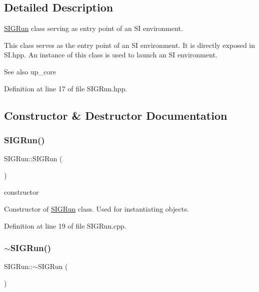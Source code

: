 \subsection{Detailed Description}
\mbox{\hyperlink{class_s_i_g_run}{S\+I\+G\+Run}} class serving as entry point of an SI environment. 

This class serves as the entry point of an SI environment. It is directly exposed in S\+I.\+hpp. An instance of this class is used to launch an SI environment. \begin{DoxySeeAlso}{See also}
up\+\_\+core 
\end{DoxySeeAlso}


Definition at line 17 of file S\+I\+G\+Run.\+hpp.



\subsection{Constructor \& Destructor Documentation}
\mbox{\label{class_s_i_g_run_a42faa5a4dd64664d6bdce6c94f5adc1d}} 
\subsubsection{\texorpdfstring{SIGRun()}{SIGRun()}}
{\footnotesize\ttfamily S\+I\+G\+Run\+::\+S\+I\+G\+Run (\begin{DoxyParamCaption}{ }\end{DoxyParamCaption})}



constructor 

Constructor of \mbox{\hyperlink{class_s_i_g_run}{S\+I\+G\+Run}} class. Used for instantiating objects. 

Definition at line 19 of file S\+I\+G\+Run.\+cpp.

\mbox{\label{class_s_i_g_run_addf9aae6daca50376eeed2b1c73e5a07}} 
\subsubsection{\texorpdfstring{$\sim$SIGRun()}{~SIGRun()}}
{\footnotesize\ttfamily S\+I\+G\+Run\+::$\sim$\+S\+I\+G\+Run (\begin{DoxyParamCaption}{ }\end{DoxyParamCaption})}



